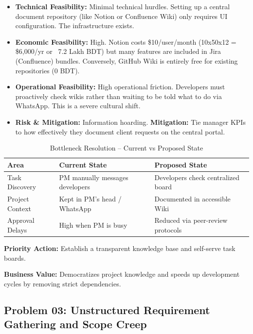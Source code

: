 \documentclass[12pt,a4paper]{report}
\begin{document}
\begin{itemize}[leftmargin=*]
    \item \textbf{Technical Feasibility:} Minimal technical hurdles. Setting up a central document repository (like Notion or Confluence Wiki) only requires UI configuration. The infrastructure exists.
    \item \textbf{Economic Feasibility:} High. Notion costs \$10/user/month (10x50x12 = \$6,000/yr or ~7.2 Lakh BDT) but many features are included in Jira (Confluence) bundles. Conversely, GitHub Wiki is entirely free for existing repositories (0 BDT).
    \item \textbf{Operational Feasibility:} High operational friction. Developers must proactively check wikis rather than waiting to be told what to do via WhatsApp. This is a severe cultural shift.
    \item \textbf{Risk \& Mitigation:} Information hoarding. \textbf{Mitigation:} Tie manager KPIs to how effectively they document client requests on the central portal.
\end{itemize}

\begin{table}[H]
\centering
\renewcommand{\arraystretch}{1.3}
\begin{tabularx}{\textwidth}{|p{4cm}|X|X|}
\hline
\rowcolor{secondary}
\textbf{Area} & \textbf{Current State} & \textbf{Proposed State} \\
\hline
Task Discovery & PM manually messages developers & Developers check centralized board \\
\hline
Project Context & Kept in PM's head / WhatsApp & Documented in accessible Wiki \\
\hline
Approval Delays & High when PM is busy & Reduced via peer-review protocols \\
\hline
\end{tabularx}
\caption{Bottleneck Resolution -- Current vs Proposed State}
\end{table}

\begin{recommendBox}
\textbf{Priority Action:} Establish a transparent knowledge base and self-serve task boards.

\textbf{Business Value:} Democratizes project knowledge and speeds up development cycles by removing strict dependencies.
\end{recommendBox}

\subsection{Problem 03: Unstructured Requirement Gathering and Scope Creep}
\end{document}
